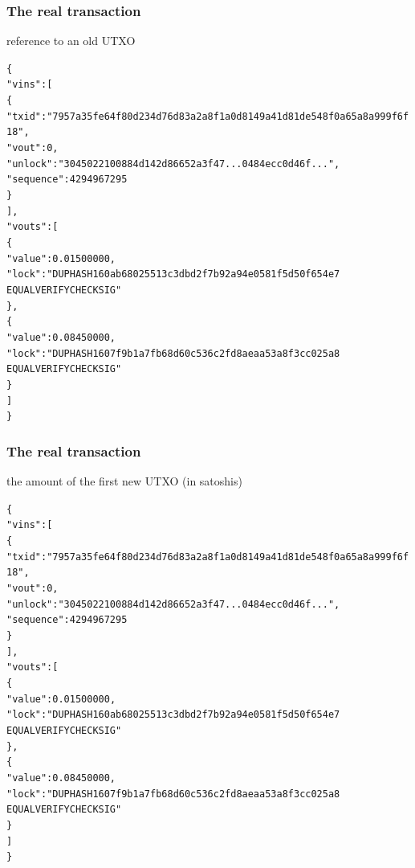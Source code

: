 \documentclass[11pt]{beamer}  %
\begin{document}
\begin{frame}[fragile]\frametitle{The real transaction}

  \begin{center}
    reference to an old UTXO
  \end{center}

  {\scriptsize\begin{alltt}
\{
  \alert{"vins": [
    \{
      "txid": "7957a35fe64f80d234d76d83a2a8f1a0d8149a41d81de548f0a65a8a999f6f18",
      "vout": 0,
      "unlock": "3045022100884d142d86652a3f47... 0484ecc0d46f...",
      "sequence": 4294967295
    \}
  ]},
  "vouts": [
    \{
      "value": 0.01500000,
      "lock": "DUP HASH160 ab68025513c3dbd2f7b92a94e0581f5d50f654e7
               EQUALVERIFY CHECKSIG"
    \},
    \{
      "value": 0.08450000,
      "lock": "DUP HASH160 7f9b1a7fb68d60c536c2fd8aeaa53a8f3cc025a8
               EQUALVERIFY CHECKSIG"
    \}
  ]
\}
\end{alltt}}

\end{frame}

\begin{frame}[fragile]\frametitle{The real transaction}

  \begin{center}
    the amount of the first new UTXO (in satoshis)
  \end{center}

  {\scriptsize\begin{alltt}
\{
  "vins": [
    \{
      "txid": "7957a35fe64f80d234d76d83a2a8f1a0d8149a41d81de548f0a65a8a999f6f18",
      "vout": 0,
      "unlock": "3045022100884d142d86652a3f47... 0484ecc0d46f...",
      "sequence": 4294967295
    \}
  ],
  "vouts": [
    \{
      \alert{"value": 0.01500000},
      "lock": "DUP HASH160 ab68025513c3dbd2f7b92a94e0581f5d50f654e7
               EQUALVERIFY CHECKSIG"
    \},
    \{
      "value": 0.08450000,
      "lock": "DUP HASH160 7f9b1a7fb68d60c536c2fd8aeaa53a8f3cc025a8
               EQUALVERIFY CHECKSIG"
    \}
  ]
\}
\end{alltt}}

\end{frame}
\end{document}
